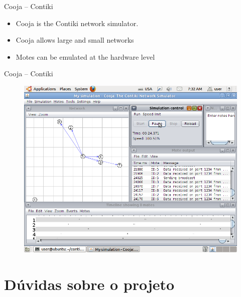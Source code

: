 \documentclass{beamer}
\begin{document}
\begin{frame}

\begin{block}{Cooja -- Contiki} 

	\begin{itemize}
		\item Cooja is the Contiki network simulator. 
		\item Cooja allows large and small networks
		\item Motes can be emulated at the hardware level
	\end{itemize}

\end{block}

\begin{block}{Cooja -- Contiki} 

	\begin{figure}[t]
		\includegraphics[width=.8\linewidth]{img/cooja.png}
	\end{figure}

\end{block}

\end{frame}
\section{Dúvidas sobre o projeto}
\end{document}
